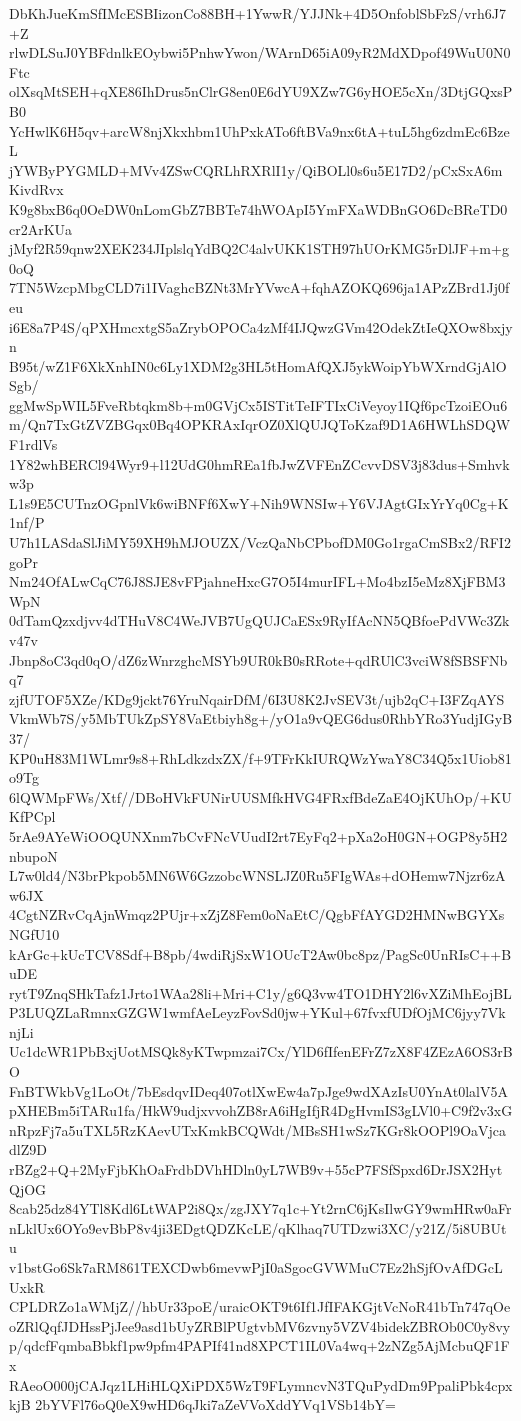 DbKhJueKmSfIMcESBIizonCo88BH+1YwwR/YJJNk+4D5OnfoblSbFzS/vrh6J7+Z
rlwDLSuJ0YBFdnlkEOybwi5PnhwYwon/WArnD65iA09yR2MdXDpof49WuU0N0Ftc
olXsqMtSEH+qXE86IhDrus5nClrG8en0E6dYU9XZw7G6yHOE5cXn/3DtjGQxsPB0
YcHwlK6H5qv+arcW8njXkxhbm1UhPxkATo6ftBVa9nx6tA+tuL5hg6zdmEc6BzeL
jYWByPYGMLD+MVv4ZSwCQRLhRXRlI1y/QiBOLl0s6u5E17D2/pCxSxA6mKivdRvx
K9g8bxB6q0OeDW0nLomGbZ7BBTe74hWOApI5YmFXaWDBnGO6DcBReTD0cr2ArKUa
jMyf2R59qnw2XEK234JIplslqYdBQ2C4alvUKK1STH97hUOrKMG5rDlJF+m+g0oQ
7TN5WzcpMbgCLD7i1IVaghcBZNt3MrYVwcA+fqhAZOKQ696ja1APzZBrd1Jj0feu
i6E8a7P4S/qPXHmcxtgS5aZrybOPOCa4zMf4IJQwzGVm42OdekZtIeQXOw8bxjyn
B95t/wZ1F6XkXnhIN0c6Ly1XDM2g3HL5tHomAfQXJ5ykWoipYbWXrndGjAlOSgb/
ggMwSpWIL5FveRbtqkm8b+m0GVjCx5ISTitTeIFTIxCiVeyoy1IQf6pcTzoiEOu6
m/Qn7TxGtZVZBGqx0Bq4OPKRAxIqrOZ0XlQUJQToKzaf9D1A6HWLhSDQWF1rdlVs
1Y82whBERCl94Wyr9+l12UdG0hmREa1fbJwZVFEnZCcvvDSV3j83dus+Smhvkw3p
L1s9E5CUTnzOGpnlVk6wiBNFf6XwY+Nih9WNSIw+Y6VJAgtGIxYrYq0Cg+K1nf/P
U7h1LASdaSlJiMY59XH9hMJOUZX/VczQaNbCPbofDM0Go1rgaCmSBx2/RFI2goPr
Nm24OfALwCqC76J8SJE8vFPjahneHxcG7O5I4murIFL+Mo4bzI5eMz8XjFBM3WpN
0dTamQzxdjvv4dTHuV8C4WeJVB7UgQUJCaESx9RyIfAcNN5QBfoePdVWc3Zkv47v
Jbnp8oC3qd0qO/dZ6zWnrzghcMSYb9UR0kB0sRRote+qdRUlC3vciW8fSBSFNbq7
zjfUTOF5XZe/KDg9jckt76YruNqairDfM/6I3U8K2JvSEV3t/ujb2qC+I3FZqAYS
VkmWb7S/y5MbTUkZpSY8VaEtbiyh8g+/yO1a9vQEG6dus0RhbYRo3YudjIGyB37/
KP0uH83M1WLmr9s8+RhLdkzdxZX/f+9TFrKkIURQWzYwaY8C34Q5x1Uiob81o9Tg
6lQWMpFWs/Xtf//DBoHVkFUNirUUSMfkHVG4FRxfBdeZaE4OjKUhOp/+KUKfPCpl
5rAe9AYeWiOOQUNXnm7bCvFNcVUudI2rt7EyFq2+pXa2oH0GN+OGP8y5H2nbupoN
L7w0ld4/N3brPkpob5MN6W6GzzobcWNSLJZ0Ru5FIgWAs+dOHemw7Njzr6zAw6JX
4CgtNZRvCqAjnWmqz2PUjr+xZjZ8Fem0oNaEtC/QgbFfAYGD2HMNwBGYXsNGfU10
kArGc+kUcTCV8Sdf+B8pb/4wdiRjSxW1OUcT2Aw0bc8pz/PagSc0UnRIsC++BuDE
rytT9ZnqSHkTafz1Jrto1WAa28li+Mri+C1y/g6Q3vw4TO1DHY2l6vXZiMhEojBL
P3LUQZLaRmnxGZGW1wmfAeLeyzFovSd0jw+YKul+67fvxfUDfOjMC6jyy7VknjLi
Uc1dcWR1PbBxjUotMSQk8yKTwpmzai7Cx/YlD6fIfenEFrZ7zX8F4ZEzA6OS3rBO
FnBTWkbVg1LoOt/7bEsdqvIDeq407otlXwEw4a7pJge9wdXAzIsU0YnAt0lalV5A
pXHEBm5iTARu1fa/HkW9udjxvvohZB8rA6iHgIfjR4DgHvmIS3gLVl0+C9f2v3xG
nRpzFj7a5uTXL5RzKAevUTxKmkBCQWdt/MBsSH1wSz7KGr8kOOPl9OaVjcadlZ9D
rBZg2+Q+2MyFjbKhOaFrdbDVhHDln0yL7WB9v+55cP7FSfSpxd6DrJSX2HytQjOG
8cab25dz84YTl8Kdl6LtWAP2i8Qx/zgJXY7q1c+Yt2rnC6jKsIlwGY9wmHRw0aFr
nLklUx6OYo9evBbP8v4ji3EDgtQDZKcLE/qKlhaq7UTDzwi3XC/y21Z/5i8UBUtu
v1bstGo6Sk7aRM861TEXCDwb6mevwPjI0aSgocGVWMuC7Ez2hSjfOvAfDGcLUxkR
CPLDRZo1aWMjZ//hbUr33poE/uraicOKT9t6If1JfIFAKGjtVcNoR41bTn747qOe
oZRlQqfJDHssPjJee9asd1bUyZRBlPUgtvbMV6zvny5VZV4bidekZBROb0C0y8vy
p/qdcfFqmbaBbkf1pw9pfm4PAPIf41nd8XPCT1IL0Va4wq+2zNZg5AjMcbuQF1Fx
RAeoO000jCAJqz1LHiHLQXiPDX5WzT9FLymncvN3TQuPydDm9PpaliPbk4cpxkjB
2bYVFl76oQ0eX9wHD6qJki7aZeVVoXddYVq1VSb14bY=
